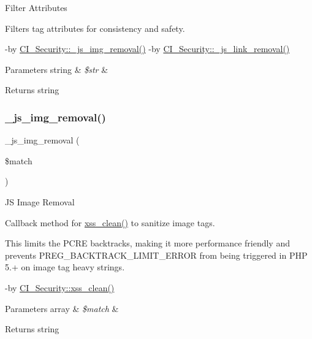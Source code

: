 Filter Attributes

Filters tag attributes for consistency and safety.

-\/by \mbox{\hyperlink{class_c_i___security_a5c5e91dc8e3df0174e4e074dd375a8db}{C\+I\+\_\+\+Security\+::\+\_\+js\+\_\+img\+\_\+removal()}} -\/by \mbox{\hyperlink{class_c_i___security_a6b1744acaf85e05c65ab17242dea4f06}{C\+I\+\_\+\+Security\+::\+\_\+js\+\_\+link\+\_\+removal()}} 
\begin{DoxyParams}[1]{Parameters}
string & {\em \$str} & \\
\hline
\end{DoxyParams}
\begin{DoxyReturn}{Returns}
string 
\end{DoxyReturn}
\mbox{\label{class_c_i___security_a5c5e91dc8e3df0174e4e074dd375a8db}} 
\subsubsection{\texorpdfstring{\+\_\+js\+\_\+img\+\_\+removal()}{\_js\_img\_removal()}}
{\footnotesize\ttfamily \+\_\+js\+\_\+img\+\_\+removal (\begin{DoxyParamCaption}\item[{}]{\$match }\end{DoxyParamCaption})\hspace{0.3cm}{\ttfamily [protected]}}

JS Image Removal

Callback method for \mbox{\hyperlink{class_c_i___security_acb759426dbab128d3d8164805225381c}{xss\+\_\+clean()}} to sanitize image tags.

This limits the P\+C\+RE backtracks, making it more performance friendly and prevents P\+R\+E\+G\+\_\+\+B\+A\+C\+K\+T\+R\+A\+C\+K\+\_\+\+L\+I\+M\+I\+T\+\_\+\+E\+R\+R\+OR from being triggered in P\+HP 5.+ on image tag heavy strings.

-\/by \mbox{\hyperlink{class_c_i___security_acb759426dbab128d3d8164805225381c}{C\+I\+\_\+\+Security\+::xss\+\_\+clean()}} 
\begin{DoxyParams}[1]{Parameters}
array & {\em \$match} & \\
\hline
\end{DoxyParams}
\begin{DoxyReturn}{Returns}
string 
\end{DoxyReturn}
\mbox{\label{class_c_i___security_a6b1744acaf85e05c65ab17242dea4f06}} 

